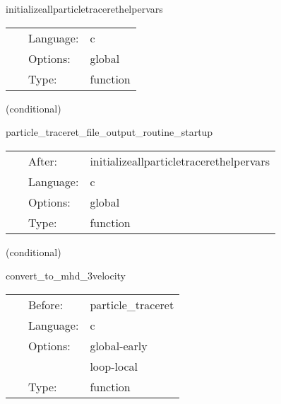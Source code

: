 \hspace{5mm} initializeallparticletracerethelpervars 

\hspace{5mm}{\it check all parameters have been set correctly; initialize particle tracer rk4 iteration counter } 


\hspace{5mm}

 \begin{tabular*}{160mm}{cll} 
~ & Language:  & c \\ 
~ & Options:  & global \\ 
~ & Type:  & function \\ 
\end{tabular*} 


\vspace{5mm}

   (conditional) 

\hspace{5mm} particle\_traceret\_file\_output\_routine\_startup 

\hspace{5mm}{\it create directory for file output. } 


\hspace{5mm}

 \begin{tabular*}{160mm}{cll} 
~ & After:  & initializeallparticletracerethelpervars \\ 
~ & Language:  & c \\ 
~ & Options:  & global \\ 
~ & Type:  & function \\ 
\end{tabular*} 


\vspace{5mm}

   (conditional) 

\hspace{5mm} convert\_to\_mhd\_3velocity 

\hspace{5mm}{\it convert to mhd 3 velocity } 


\hspace{5mm}

 \begin{tabular*}{160mm}{cll} 
~ & Before:  & particle\_traceret \\ 
~ & Language:  & c \\ 
~ & Options:  & global-early \\ 
~& ~ &loop-local\\ 
~ & Type:  & function \\ 
\end{tabular*} 


